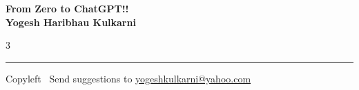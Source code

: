 \documentclass[8pt,landscape]{article}
\begin{document}
\footnotesize


\begin{center}
\Large{\textbf{From Zero to ChatGPT!!\\ Yogesh Haribhau Kulkarni}}
\end{center}

\begin{multicols}{3}

\end{multicols}

\rule{\linewidth}{0.25pt}
\scriptsize
Copyleft \textcopyleft\  Send suggestions to
\href{http://www.yogeshkulkarni.com}{yogeshkulkarni@yahoo.com}
\end{document}
